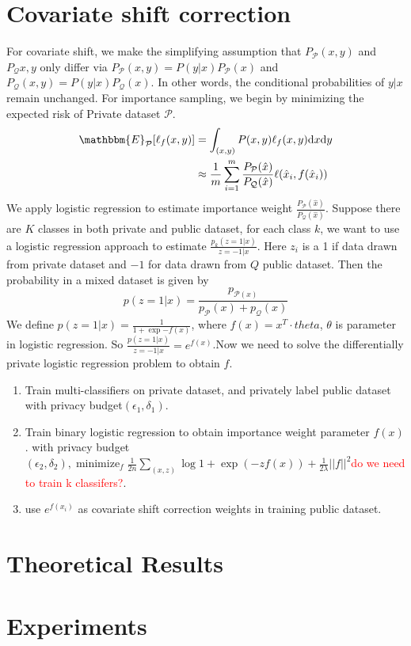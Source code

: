 \documentclass{article}
\theoremstyle{definition}
\newcommand{\minimize}{\mathop{\mathrm{minimize}}}
\newcommand{\red}[1]{\textcolor{red}{#1}}
\def\cP{\mathcal{P}}
\def\cQ{\mathcal{Q}}
\begin{document}
\section{Covariate shift correction}
For covariate shift, we make the simplifying assumption that $P_{\cP}(x,y)$ and $P_{\cQ}{x,y}$ only differ via $P_{\cP}(x,y) = P(y|x)P_{\cP}(x)$ and $P_{\cQ}(x,y) = P(y|x)P_{\cQ}(x)$. In other words, the conditional probabilities of $y|x$ remain unchanged. For importance sampling, we begin by minimizing the expected risk of Private dataset $\cP$.
\begin{align*}
\mathbbm{E}_{\mathcal{P}}[\ell_f(x,y)]&=\int_{(x,y)}P(x,y)\ell_f(x,y){\rm d}x{\rm d}y\\
&\approx \frac{1}{m}\sum_{i=1}^m \frac{P_\mathcal{P}(\hat{x})}{P_\mathcal{Q}(\hat{x})}\ell(\hat{x}_i,f(\hat{x}_i))
\end{align*}
We apply logistic regression to estimate importance weight $\frac{P_\mathcal{P}(\hat{x})}{P_\mathcal{Q}(\hat{x})}$. Suppose there are $K$ classes in both private and public dataset, for each class $k$, we want to use a logistic regression approach to estimate $\frac{p_k(z=1|x)}{z=-1|x}$. Here $z_i$ is a 1 if data drawn from private dataset and $-1$ for data drawn from $Q$ public dataset. Then the probability in a mixed dataset is given by
$$
p(z=1|x) =\frac{p_{\cP(x)}}{p_\cP(x)+p_\cQ(x)}
$$
We define $p(z=1|x) = \frac{1}{1+\exp{-f(x)}}$, where $f(x) = x^T \cdot theta$, $\theta$ is parameter in logistic regression.  So $\frac{p(z=1|x)}{z=-1|x} = e^{f(x)}$.Now we need to solve the differentially private logistic regression problem to obtain $f$.
\begin{enumerate}
	\item Train multi-classifiers on private dataset, and privately label public dataset with privacy budget$(\epsilon_1, \delta_1)$.
	\item Train binary logistic regression to obtain importance weight parameter $f(x)$.
	with privacy budget$(\epsilon_2, \delta_2),\minimize_f \frac{1}{2n} \sum_{(x,z)} \log{1 + \exp(-zf(x))} +\frac{1}{2\lambda}||f||^2 $\red{do we need to train k classifers?}. 
	\item use $e^{f(x_i)}$ as covariate shift correction weights in training public dataset.
\end{enumerate}
\section{Theoretical Results}

\section{Experiments}
\end{document}

